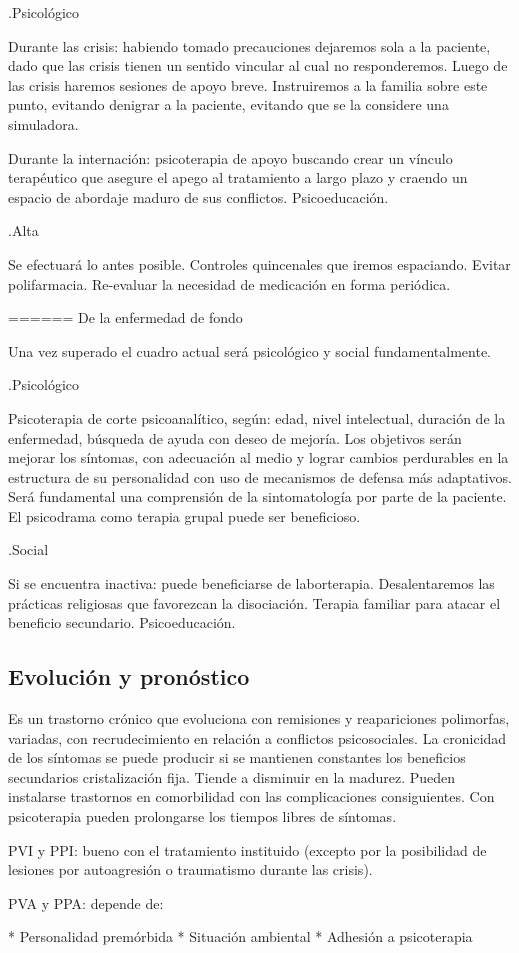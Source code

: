 .Psicológico

Durante las crisis: habiendo tomado precauciones dejaremos sola a la paciente, dado que las crisis tienen un sentido vincular al cual no responderemos. Luego de las crisis haremos sesiones de apoyo breve. Instruiremos a la familia sobre este punto, evitando denigrar a la paciente, evitando que se la considere una simuladora. 

Durante la internación: psicoterapia de apoyo buscando crear un vínculo terapéutico que asegure el apego al tratamiento a largo plazo y craendo un espacio de abordaje maduro de sus conflictos. Psicoeducación.

.Alta

Se efectuará lo antes posible. Controles quincenales que iremos espaciando. Evitar polifarmacia. Re-evaluar la necesidad de medicación en forma periódica.

====== De la enfermedad de fondo

Una vez superado el cuadro actual será psicológico y social fundamentalmente.

.Psicológico

Psicoterapia de corte psicoanalítico, según: edad, nivel intelectual, duración de la enfermedad, búsqueda de ayuda con deseo de mejoría. Los objetivos serán mejorar los síntomas, con adecuación al medio y lograr cambios perdurables en la estructura de su personalidad con uso de mecanismos de defensa más adaptativos. Será fundamental una comprensión de la sintomatología por parte de la paciente. El psicodrama como terapia grupal puede ser beneficioso.

.Social

Si se encuentra inactiva: puede beneficiarse de laborterapia. Desalentaremos las prácticas religiosas que favorezcan la disociación. Terapia familiar para atacar el beneficio secundario. Psicoeducación.
\subsection*{Evolución y pronóstico}

Es un trastorno crónico que evoluciona con remisiones y reapariciones polimorfas, variadas, con recrudecimiento en relación a conflictos psicosociales. La cronicidad de los síntomas se puede producir si se mantienen constantes los beneficios secundarios cristalización fija. Tiende a disminuir en la madurez. Pueden instalarse trastornos en comorbilidad con las complicaciones consiguientes.
Con psicoterapia pueden prolongarse los tiempos libres de síntomas. 

PVI y PPI: bueno con el tratamiento instituido (excepto por la posibilidad de lesiones por autoagresión o traumatismo durante las crisis).

PVA y PPA: depende de:

* Personalidad premórbida
* Situación ambiental
* Adhesión a psicoterapia
